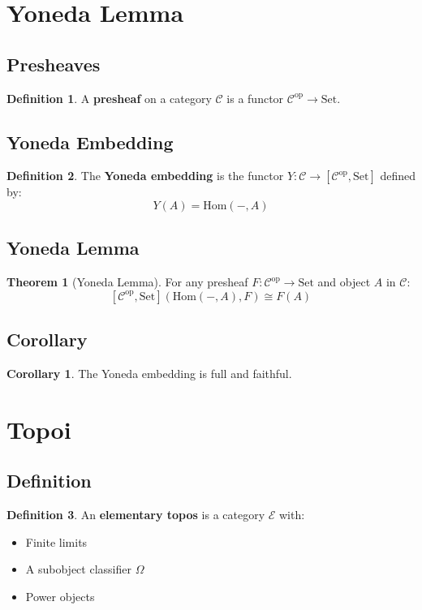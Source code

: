 \documentclass[11pt]{article}
\theoremstyle{definition}
\newtheorem{definition}{Definition}[section]
\newtheorem{theorem}{Theorem}[section]
\newtheorem{corollary}{Corollary}[section]
\begin{document}
\section{Yoneda Lemma}

\subsection{Presheaves}
\begin{definition}
A \textbf{presheaf} on a category $\mathcal{C}$ is a functor $\mathcal{C}^{\text{op}} \to \text{Set}$.
\end{definition}

\subsection{Yoneda Embedding}
\begin{definition}
The \textbf{Yoneda embedding} is the functor $Y: \mathcal{C} \to [\mathcal{C}^{\text{op}}, \text{Set}]$ defined by:
$$Y(A) = \text{Hom}(-, A)$$
\end{definition}

\subsection{Yoneda Lemma}
\begin{theorem}[Yoneda Lemma]
For any presheaf $F: \mathcal{C}^{\text{op}} \to \text{Set}$ and object $A$ in $\mathcal{C}$:
$$[\mathcal{C}^{\text{op}}, \text{Set}](\text{Hom}(-, A), F) \cong F(A)$$
\end{theorem}

\subsection{Corollary}
\begin{corollary}
The Yoneda embedding is full and faithful.
\end{corollary}

\section{Topoi}

\subsection{Definition}
\begin{definition}
An \textbf{elementary topos} is a category $\mathcal{E}$ with:
\begin{itemize}
    \item Finite limits
    \item A subobject classifier $\Omega$
    \item Power objects
\end{itemize}
\end{definition}
\end{document}
